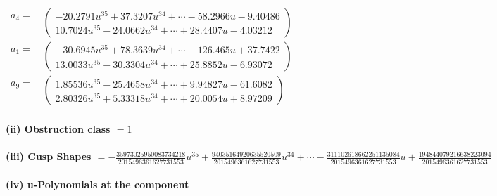 \documentclass[1p]{elsarticle_modified}
\theoremstyle{definition}
\begin{document}
\begin{tabular}{m{7pt} m{180pt} m{7pt} m{180pt} }
\flushright $a_{4}=$&$\begin{pmatrix}-20.2791 u^{35}+37.3207 u^{34}+\cdots-58.2966 u-9.40486\\10.7024 u^{35}-24.0662 u^{34}+\cdots+28.4407 u-4.03212\end{pmatrix}$ \\
\flushright $a_{1}=$&$\begin{pmatrix}-30.6945 u^{35}+78.3639 u^{34}+\cdots-126.465 u+37.7422\\13.0033 u^{35}-30.3304 u^{34}+\cdots+25.8852 u-6.93072\end{pmatrix}$ \\
\flushright $a_{9}=$&$\begin{pmatrix}1.85536 u^{35}-25.4658 u^{34}+\cdots+9.94827 u-61.6082\\2.80326 u^{35}+5.33318 u^{34}+\cdots+20.0054 u+8.97209\end{pmatrix}$\\&\end{tabular}
\flushleft \textbf{(ii) Obstruction class $= 1$}\\~\\
\flushleft \textbf{(iii) Cusp Shapes $= -\frac{35973025950083734218}{2015496361627731553} u^{35}+\frac{94035164920635520509}{2015496361627731553} u^{34}+\cdots-\frac{311102618662251135084}{2015496361627731553} u+\frac{194844079216638223094}{2015496361627731553}$}\\~\\
\newpage\renewcommand{\arraystretch}{1}
\flushleft \textbf{(iv) u-Polynomials at the component}\newline \\
\end{document}
